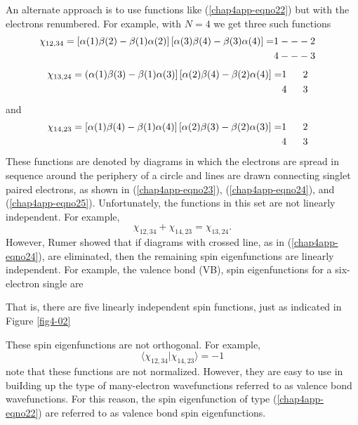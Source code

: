 An alternate approach is to use functions like (\ref{chap4app-eqno22}) but with the 
electrons renumbered.  For example, with $N = 4$ we get three such functions
\begin{eqnarray}
\chi_{12,34} = \left[ \alpha ( 1 ) \beta ( 2 ) - \beta (1) \alpha (2) 
\right] \left[ \alpha (3) \beta (4) - \beta (3) \alpha (4) \right] =
& 1 --- 2\cr
& 4 --- 3\cr
%
\label{chap4app-eqno23}
\end{eqnarray}
\begin{eqnarray}
\chi_{13,24} = \left( \alpha (1) \beta (3) - \beta (1) \alpha (3) 
\right] \left[ \alpha (2) \beta (4) - \beta (2) \alpha (4) \right] =
& 1 {~~~~~} 2\cr
& 4 {~~~~~} 3\cr
%
\label{chap4app-eqno24}
\end{eqnarray}
and
\begin{eqnarray}
\chi_{14,23} = \left[ \alpha (1) \beta (4) - \beta (1) \alpha (4) 
\right] \left[ \alpha (2) \beta (3) - \beta (2) \alpha (3) \right] = 
& 1 {~~~~~} 2\cr
& 4 {~~~~~} 3\cr
%
\label{chap4app-eqno25}
\end{eqnarray}
These functions are denoted by diagrams in which the electrons are
spread in sequence around the periphery of a circle and lines are
drawn connecting singlet paired electrons, as shown in
(\ref{chap4app-eqno23}), (\ref{chap4app-eqno24}), and
(\ref{chap4app-eqno25}).  Unfortunately, the functions in this set are
not linearly independent.  For example,
\begin{equation}
\chi_{12,34} + \chi_{14,23} = \chi_{13,24} .
\end{equation}
However, Rumer showed that if diagrams with crossed line, as in
(\ref{chap4app-eqno24}), are eliminated, then the remaining spin
eigenfunctions are linearly independent.  For example, the valence
bond (VB), spin eigenfunctions for a six-electron single are


That is, there are five linearly independent spin functions, just as 
indicated in Figure \ref{fig4-02}

These spin eigenfunctions are not orthogonal. For example,
\begin{equation}
\langle \chi_{12,34} | \chi_{14,23} \rangle = - 1
\end{equation}
note that these functions are not normalized.  However, they are easy to 
use in buiIding up the type of many-electron wavefunctions referred to as 
valence bond wavefunctions.  For this reason, the spin eigenfunction of type 
(\ref{chap4app-eqno22}) are referred to as valence bond spin eigenfunctions.

